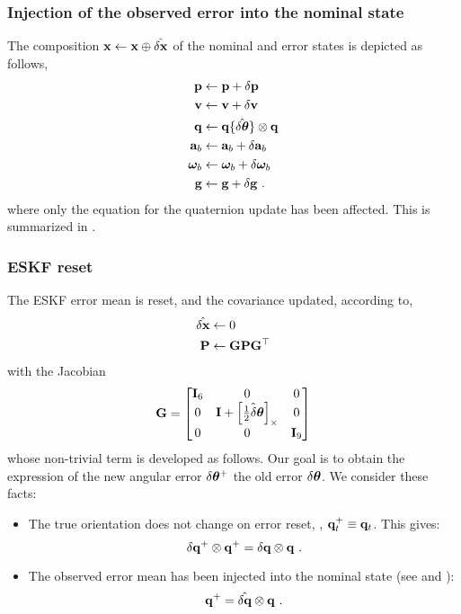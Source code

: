 \subsubsection{Injection of the observed error into the nominal state}

The composition ${\bf x} \gets {\bf x}\oplus\hat{\delta{\bf x}}$ of the nominal and error states is depicted as follows,
%
\begin{subequations}
%
\begin{align}
{\bf p} &\gets {\bf p} + \delta{\bf p} \\
{\bf v} &\gets {\bf v} + \delta{\bf v} \\
{\bf q} &\gets {\bf q}\{\hat{\delta{\bm \theta}}\} \otimes {\bf q} \\ 
{\bf a}_b &\gets {\bf a}_b + \delta{\bf a}_b \\
{\bm \omega}_b &\gets {\bm \omega}_b + \delta{\bm \omega}_b \\
{\bf g} &\gets {\bf g} + \delta{\bf g} ~.
\end{align}%
\end{subequations}
%
where only the equation for the quaternion update has been affected. 
This is summarized in .

\subsubsection{ESKF reset}

The ESKF error mean is reset, and the covariance updated, according to,
%
%
\begin{align}
\hat{\delta{\bf x}} &\gets 0 \\
{\bf P} &\gets {\bf G}{\bf P}{\bf G}^{\top}
\end{align}%
%
with the Jacobian
%
\begin{equation}
{\bf G} = \begin{bmatrix}
{\bf I}_6 & 0 & 0 \\
0 & {\bf I}+\left[\hat{\frac12\delta{\bm \theta}}\right]_\times & 0 \\
0 & 0 & {\bf I}_9
\end{bmatrix}
\end{equation}
%
whose non-trivial term is developed as follows. 
Our goal is to obtain the expression of the new angular error $\delta{\bm \theta}^+$ \wrt the old error $\delta{\bm \theta}$. 
We consider these facts:
\begin{itemize}
\item
The true orientation does not change on error reset, \ie, ${\bf q}_t^+ \equiv {\bf q}_t$. This gives:
%
\begin{equation}
\delta{\bf q}^+\otimes{\bf q}^+ = \delta{\bf q}\otimes {\bf q}~.
\end{equation}
%
\item
The observed error mean has been injected into the nominal state (see  and ):
%
\begin{equation}
{\bf q}^+ = \hat{\delta{\bf q}} \otimes {\bf q} ~.
\end{equation}
\end{itemize}

